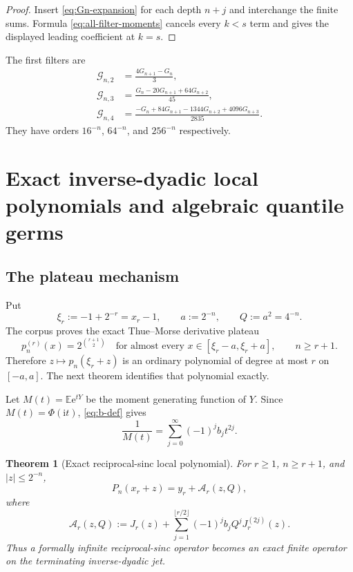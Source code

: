 \documentclass[11pt,oneside]{article}
\numberwithin{equation}{section}
\newtheorem{theorem}{Theorem}[section]
\theoremstyle{definition}
\theoremstyle{remark}
\newcommand{\E}{\mathbb E}
\newcommand{\e}{\mathrm e}
\newcommand{\ii}{\mathrm i}
\newcommand{\Fn}{P_n}
\begin{document}
\begin{proof}
Insert \eqref{eq:Gn-expansion} for each depth $n+j$ and interchange the finite
sums.  Formula \eqref{eq:all-filter-moments} cancels every $k<s$ term and gives
the displayed leading coefficient at $k=s$.
\end{proof}

The first filters are
\begin{align}
 \mathcal G_{n,2}&=\frac{4G_{n+1}-G_n}{3},
 \label{eq:R2-filter}\\
 \mathcal G_{n,3}&=\frac{G_n-20G_{n+1}+64G_{n+2}}{45},
 \label{eq:R3-filter}\\
 \mathcal G_{n,4}&=
 \frac{-G_n+84G_{n+1}-1344G_{n+2}+4096G_{n+3}}{2835}.
 \label{eq:R4-filter}
\end{align}
They have orders $16^{-n}$, $64^{-n}$, and $256^{-n}$ respectively.

\section{Exact inverse-dyadic local polynomials and algebraic quantile germs}
\label{sec:exact-local}

\subsection{The plateau mechanism}

Put
\begin{equation}
 \xi_r:=-1+2^{-r}=x_r-1,
 \qquad a:=2^{-n},\qquad Q:=a^2=4^{-n}.
 \label{eq:xi-a-Q}
\end{equation}
The corpus proves the exact Thue--Morse derivative plateau
\begin{equation}
 p_n^{(r)}(x)=2^{\binom{r+1}{2}}
 \quad\text{for almost every }x\in[\xi_r-a,\xi_r+a],
 \qquad n\ge r+1.
 \label{eq:plateau-imported}
\end{equation}
Therefore $z\mapsto p_n(\xi_r+z)$ is an ordinary polynomial of degree at most
$r$ on $[-a,a]$.  The next theorem identifies that polynomial exactly.

Let $M(t)=\E\e^{tY}$ be the moment generating function of $Y$.  Since
$M(t)=\Phi(\ii t)$, \eqref{eq:b-def} gives
\begin{equation}
 \frac1{M(t)}=\sum_{j=0}^{\infty}(-1)^jb_jt^{2j}.
 \label{eq:reciprocal-MGF}
\end{equation}

\begin{theorem}[Exact reciprocal-sinc local polynomial]
\label{thm:exact-local-polynomial}
For $r\ge1$, $n\ge r+1$, and $|z|\le2^{-n}$,
\begin{equation}
 \boxed{
 \Fn(x_r+z)=y_r+\mathcal A_r(z,Q),}
 \label{eq:exact-local-Pn}
\end{equation}
where
\begin{equation}
 \boxed{
 \mathcal A_r(z,Q):=
 J_r(z)+\sum_{j=1}^{\lfloor r/2\rfloor}
 (-1)^jb_jQ^jJ_r^{(2j)}(z).}
 \label{eq:Ar-def}
\end{equation}
Thus a formally infinite reciprocal-sinc operator becomes an exact finite operator on the
terminating inverse-dyadic jet.
\end{theorem}
\end{document}
